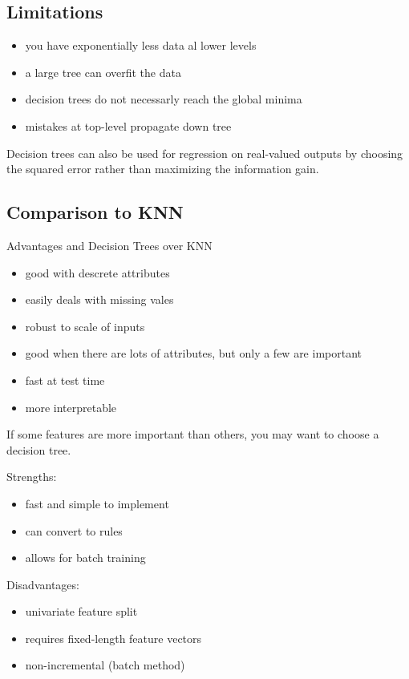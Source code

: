 \documentclass{article}
\begin{document}
\subsection{Limitations}\label{limitations}

\begin{itemize}
\tightlist
\item
  you have exponentially less data al lower levels
\item
  a large tree can overfit the data
\item
  decision trees do not necessarly reach the global minima
\item
  mistakes at top-level propagate down tree
\end{itemize}

Decision trees can also be used for regression on real-valued outputs by
choosing the squared error rather than maximizing the information gain.

\subsection{Comparison to KNN}\label{comparison-to-knn}

Advantages and Decision Trees over KNN

\begin{itemize}
\tightlist
\item
  good with descrete attributes
\item
  easily deals with missing vales
\item
  robust to scale of inputs
\item
  good when there are lots of attributes, but only a few are important
\item
  fast at test time
\item
  more interpretable
\end{itemize}

If some features are more important than others, you may want to choose
a decision tree.

Strengths:

\begin{itemize}
\tightlist
\item
  fast and simple to implement
\item
  can convert to rules
\item
  allows for batch training
\end{itemize}

Disadvantages:

\begin{itemize}
\tightlist
\item
  univariate feature split
\item
  requires fixed-length feature vectors
\item
  non-incremental (batch method)
\end{itemize}
\end{document}
